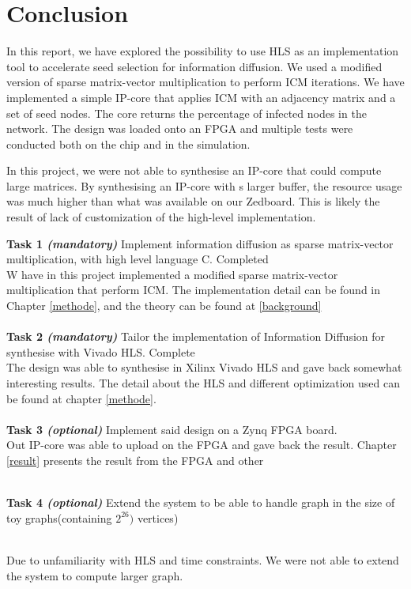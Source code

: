 \chapter{Conclusion}
In this report, we have explored the possibility to use HLS as an implementation tool to accelerate seed selection for information diffusion. We used a modified version of sparse matrix-vector multiplication to perform ICM iterations. We have implemented a simple IP-core that applies ICM with an adjacency matrix and a set of seed nodes. The core returns the percentage of infected nodes in the network. The design was loaded onto an FPGA and multiple tests were conducted both on the chip and in the simulation.

In this project, we were not able to synthesise an IP-core that could compute large matrices. By synthesising an  IP-core with s larger buffer, the resource usage was much higher than what was available on our Zedboard. This is likely the result of lack of customization of the high-level implementation.
 

\textbf{Task 1 \textit{(mandatory)}} Implement information diffusion as sparse matrix-vector multiplication, with high level language C. Completed
\\

W have in this project implemented a modified sparse matrix-vector multiplication that perform ICM. The implementation detail can be found in Chapter \ref{methode}, and the theory can be found at \ref{background}  \\ \hfil \\ \hfil
\textbf{Task 2 \textit{(mandatory)}} Tailor the implementation of Information Diffusion for synthesise with Vivado HLS. Complete \\

The design was able to synthesise in Xilinx Vivado HLS and gave back somewhat interesting results. The detail about the HLS and different optimization used can be found at chapter \ref{methode}.  \\ \hfil \\ \hfil
\textbf{Task 3 \textit{(optional)}} Implement said design on a  Zynq FPGA board.\\

Out IP-core was able to upload on the FPGA and gave back the result. Chapter \ref{result} presents the result from the FPGA and other 
 \\ \hfil \\ \hfil
 
\textbf{Task 4 \textit{(optional)}} Extend the system to be able to handle graph in the size of toy graphs(containing $2^{26})$ vertices) \\ \hfil \\ \hfil

Due to unfamiliarity with HLS and time constraints. We were not able to extend the system to compute larger graph.  \\


